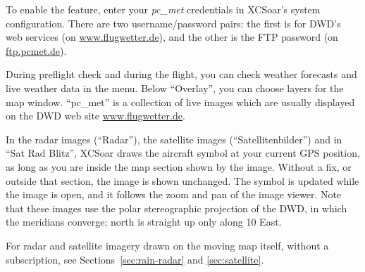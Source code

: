 To enable the feature, enter your \emph{pc\_met} credentials in
XCSoar's system configuration.  There are two username/password pairs:
the first is for DWD's web services (on \url{www.flugwetter.de}),
and the other is the FTP password (on \url{ftp.pcmet.de}).

During preflight check and during the flight, you can check weather
forecasts and live weather data in the
  menu.
Below ``Overlay'', you can choose layers for the map window.
``pc\_met'' is a collection of live images which are usually displayed
on the DWD web site \url{www.flugwetter.de}.

In the radar images (``Radar''), the satellite images
(``Satellitenbilder'') and in ``Sat Rad Blitz'', XCSoar draws the
aircraft symbol at your current GPS position, as long as you are
inside the map section shown by the image.  Without a fix, or outside
that section, the image is shown unchanged.  The symbol is updated
while the image is open, and it follows the zoom and pan of the image
viewer.  Note that these images use the polar stereographic
projection of the DWD, in which the meridians converge; north is
straight up only along 10\degree{} East.

For radar and satellite imagery drawn on the moving map itself,
without a subscription, see Sections~\ref{sec:rain-radar} and
\ref{sec:satellite}.
